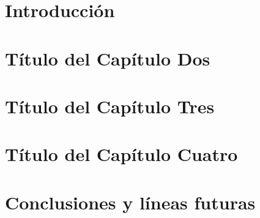 \documentclass[spanish,a4paper,11pt,oneside]{extreport}
\begin{document}
\listoffigures

\newpage{\pagestyle{empty}}

\listoftables

\newpage{\pagestyle{empty}}

\renewcommand{\thepage}{\arabic{page}}
\setcounter{page}{1}

\chapter{Introducción}
\label{chapter:intro}




\chapter{Título del Capítulo Dos}
\label{chapter:dos}



\newpage{\pagestyle{empty}}
\thispagestyle{empty}

\chapter{Título del Capítulo Tres}
\label{chapter:tres}




\chapter{Título del Capítulo Cuatro}
\label{chapter:cuatro}



\newpage{\pagestyle{empty}}
\thispagestyle{empty}

\chapter{Conclusiones y líneas futuras}
\label{chapter:Conclusiones}
\end{document}

